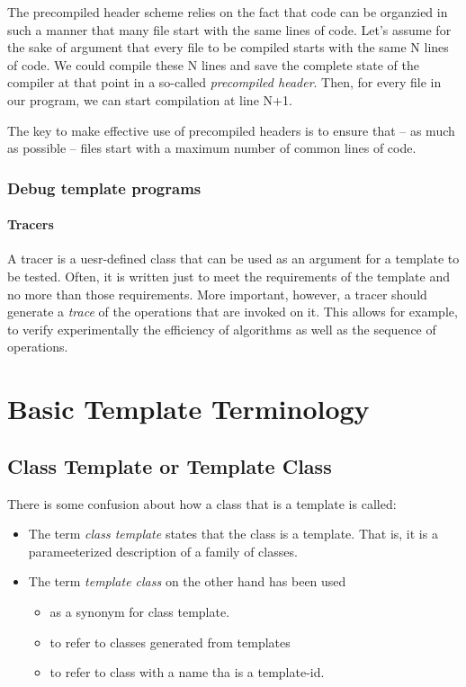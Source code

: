 \documentclass[11pt, a4paper]{book}
\begin{document}
\begin{itemize}
The precompiled header scheme relies on the fact that code can be organzied in such a manner that many file start with the same lines of code. Let's assume for the sake of argument that every file to be compiled starts with the same N lines of code. We could compile these N lines and save the complete state of the compiler at that point in a so-called \emph{precompiled header}. Then, for every file in our program, we can start compilation at line N+1. 

The key to make effective use of precompiled headers is to ensure that -- as much as possible -- files start with a maximum number of common lines of code.

\subsubsection{Debug template programs}
\paragraph{Tracers}

A tracer is a uesr-defined class that can be used as an argument for a template to be tested. Often, it is written just to meet the requirements of the template and no more than those requirements. More important, however, a tracer should generate a \emph{trace} of the operations that are invoked on it. This allows for example, to verify experimentally the efficiency of algorithms as well as the sequence of operations.
\section{Basic Template Terminology}
\subsection{Class Template or Template Class}
There is some confusion about how a class that is a template is called:
\begin{itemize}
\item The term \emph{class template} states that the class is a template. That is, it is a parameeterized description of a family of classes.
\item The term \emph{template class} on the other hand has been used
	\begin{itemize}
	\item as a synonym for class template.
	\item to refer to classes generated from templates
	\item to refer to class with a name tha is a template-id.
	\end{itemize}
\end{itemize}

\end{itemize}
\end{document}

